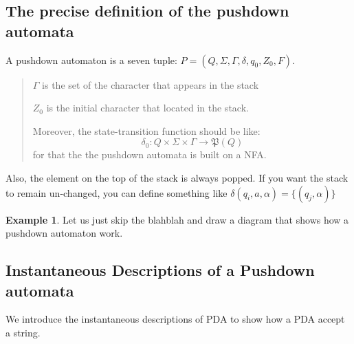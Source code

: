 \documentclass[12pt]{article}
\theoremstyle{definition}
\newtheorem{exam}[definition]{Example}
\theoremstyle{remark}
\newcommand{\ip}[2]{(#1,#2)}
\begin{document}
\subsection{The precise definition of the pushdown automata}
A pushdown automaton is a seven tuple: \(P = (Q , \Sigma , \Gamma ,\delta , q_{0}, Z _{0} , F)\). 
\begin{quotation}
	\( \Gamma\) is the set of the character that appears in the stack 

	\smallskip
	\( Z _{0}\) is the initial character that located in the stack. 

	\smallskip
	Moreover, the state-transition function should be like: 
	\[
		\delta _{0} \colon Q \times \Sigma \times \Gamma \to \mathfrak P (Q)
	\]
	for that the the pushdown automata is built on a NFA.
\end{quotation}
Also, the element on the top of the stack is always popped. If you want the stack to remain un-changed, you can define something like \(\delta (q_{i}, a,\alpha) = \{ \ip {q_{j}}\alpha \}\) 


\begin{exam}
Let us just skip the blahblah and draw a diagram that shows how a pushdown automaton work. 
\begin{figure}
	\centering
{}
\end{figure}
\end{exam}

\subsection{Instantaneous Descriptions of a Pushdown automata}
We introduce the instantaneous descriptions of PDA to show how 
a PDA accept a string. 
\end{document}

